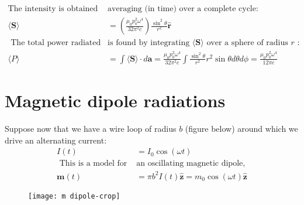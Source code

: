\begin{align*}
 \text{The intensity is obtained by }&\text{averaging (in time) over a complete cycle:}\\
 \langle\mathbf{S}\rangle&=\left(\frac{\mu_{0} p_{0}^{2} \omega^{4}}{32 \pi^{2} c}\right) \frac{\sin ^{2} \theta}{r^{2}} \hat{\mathbf{r}}\\
\text{ The total power radiated }&\text{is found by integrating $\langle\mathbf{S}\rangle$ over a sphere of radius $r$ :}\\
  \langle P\rangle&=\int\langle\mathbf{S}\rangle \cdot d \mathbf{a}=\frac{\mu_{0} p_{0}^{2} \omega^{4}}{32 \pi^{2} c} \int \frac{\sin ^{2} \theta}{r^{2}} r^{2} \sin \theta d \theta d \phi=\frac{\mu_{0} p_{0}^{2} \omega^{4}}{12 \pi c}
 \end{align*}
 \section{Magnetic dipole radiations}
 Suppose now that we have a wire loop of radius $b$ (figure below) around which we drive an alternating current:
 \begin{align*}
I(t)&=I_{0} \cos (\omega t)\\
\text{ This is a model for }&\text{an oscillating magnetic dipole,}\\
 \mathbf{m}(t)&=\pi b^{2} I(t) \hat{\mathbf{z}}=m_{0} \cos (\omega t) \hat{\mathbf{z}}
 \end{align*}
 \begin{figure}[H]
 	\centering
 	\texttt{[image: m dipole-crop]}
 	\caption{}
 	\label{}
 \end{figure}
